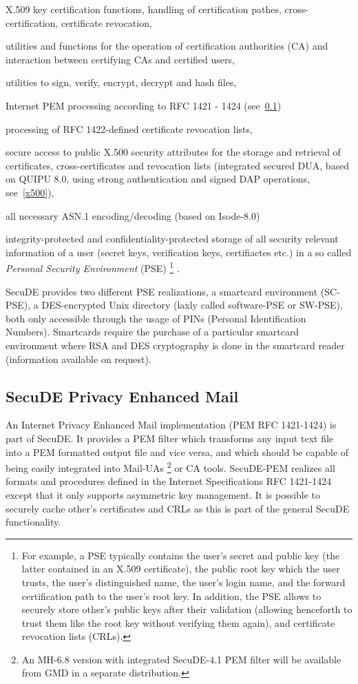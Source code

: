\m X.509 key certification functions, handling of certification pathes, 
   cross-certification, certificate revocation,

\m utilities and functions for the operation of certification authorities 
   (CA) and interaction between certifying CAs and certified users,

\m utilities to sign, verify, encrypt, decrypt and hash files,

\m Internet PEM processing according to RFC 1421 - 1424 (see~\ref{pem})

\m processing of RFC 1422-defined certificate revocation lists,

\m secure access to public X.500 security attributes for the storage 
   and retrieval of certificates, cross-certificates and revocation 
   lists (integrated secured DUA, based on QUIPU 8.0, using strong 
   authentication and signed DAP operations, see~\ref{x500}),

\m all necessary ASN.1 encoding/decoding (based on Isode-8.0)

\m integrity-protected and confidentiality-protected storage of all security 
   relevant information of a user (secret keys, verification keys, certifiactes
   etc.) in a so called {\em Personal Security Environment} (PSE)
\footnote{
For example, a PSE typically contains the user's secret and public key (the latter
contained in an X.509 certificate), the public root key which the user
trusts, the user's distinguished name, the user's login name, and the 
forward certification path to the user's root key. In addition, the PSE 
allows to securely store other's public keys after their validation 
(allowing henceforth to trust them like the root key without verifying 
them again), and certificate revocation lists (CRLs).}
.
\ei
 
SecuDE provides two different PSE realizations,
\bi 
\m a smartcard environment (SC-PSE), 
\m a DES-encrypted Unix directory (laxly called software-PSE or SW-PSE),
\ei 
both only accessible through the usage of PINs (Personal Identification Numbers).
Smartcards require the purchase of a particular smartcard environment where 
RSA and DES cryptography is done in the smartcard reader (information available 
on request).

\subsection{SecuDE Privacy Enhanced Mail}
\label{pem}
An Internet Privacy Enhanced Mail implementation (PEM RFC 1421-1424) 
is part of SecuDE. It provides a PEM filter
which transforms any input text file into a PEM formatted output file 
and vice versa, and which should be capable of being  easily 
integrated into Mail-UAs \footnote{An MH-6.8 version with integrated 
SecuDE-4.1 PEM filter will be available from GMD
in a separate distribution.}
or CA tools. SecuDE-PEM realizes all formats 
and procedures defined in the Internet Specifications RFC 1421-1424 
except that it only supports asymmetric key management. It is
possible to securely cache other's certificates and CRLs as this 
is part of the general SecuDE functionality.


